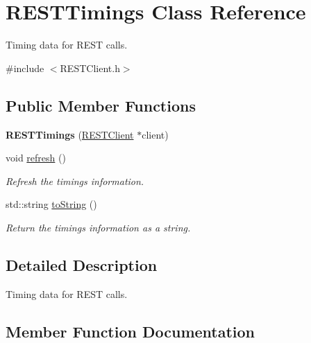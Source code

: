 \hypertarget{class_r_e_s_t_timings}{}\section{R\+E\+S\+T\+Timings Class Reference}
\label{class_r_e_s_t_timings}


Timing data for R\+E\+ST calls.  




{\ttfamily \#include $<$R\+E\+S\+T\+Client.\+h$>$}

\subsection*{Public Member Functions}
\begin{DoxyCompactItemize}
\item 
{\bfseries R\+E\+S\+T\+Timings} (\hyperlink{class_r_e_s_t_client}{R\+E\+S\+T\+Client} $\ast$client)\hypertarget{class_r_e_s_t_timings_aee2e9a6dfca7cb179fd9a310c206b0b6}{}\label{class_r_e_s_t_timings_aee2e9a6dfca7cb179fd9a310c206b0b6}

\item 
void \hyperlink{class_r_e_s_t_timings_a567d407b236bfbfd848f82bc5d79bcd4}{refresh} ()\hypertarget{class_r_e_s_t_timings_a567d407b236bfbfd848f82bc5d79bcd4}{}\label{class_r_e_s_t_timings_a567d407b236bfbfd848f82bc5d79bcd4}

\begin{DoxyCompactList}\small\item\em Refresh the timings information. \end{DoxyCompactList}\item 
std\+::string \hyperlink{class_r_e_s_t_timings_a38883c6a6e99470292cbfa847db73830}{to\+String} ()
\begin{DoxyCompactList}\small\item\em Return the timings information as a string. \end{DoxyCompactList}\end{DoxyCompactItemize}


\subsection{Detailed Description}
Timing data for R\+E\+ST calls. 

\subsection{Member Function Documentation}
